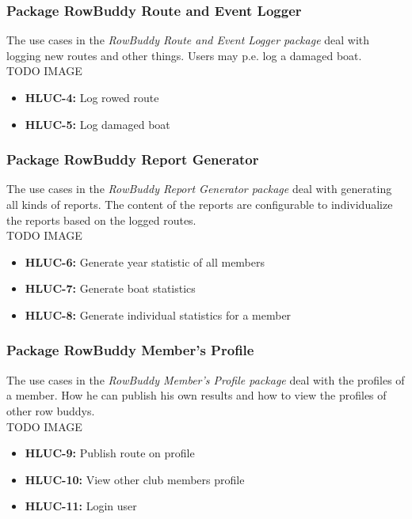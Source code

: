 		
		\subsubsection{Package RowBuddy Route and Event Logger}
		The use cases in the \textit{RowBuddy Route and Event Logger package} deal with logging new routes and other things. Users may p.e. log a damaged boat.\\
		
		TODO IMAGE
		\begin{itemize}
			\item \textbf{HLUC-4:} Log rowed route
			\item \textbf{HLUC-5:} Log damaged boat
		\end{itemize}
		
		\subsubsection{Package RowBuddy Report Generator}
		The use cases in the \textit{RowBuddy Report Generator package} deal with generating all kinds of reports. The content of the reports are configurable to individualize the reports based on the logged routes.\\
				
		TODO IMAGE
		\begin{itemize}
			\item \textbf{HLUC-6:} Generate year statistic of all members
			\item \textbf{HLUC-7:} Generate boat statistics
			\item \textbf{HLUC-8:} Generate individual statistics for a member
		\end{itemize}
		
		
		\subsubsection{Package RowBuddy Member's Profile}
		The use cases in the \textit{RowBuddy Member's Profile package} deal with the profiles of a member. How he can publish his own results and how to view the profiles of other row buddys.\\
		
		TODO IMAGE
		\begin{itemize}
			\item \textbf{HLUC-9:} Publish route on profile
			\item \textbf{HLUC-10:} View other club members profile
			\item \textbf{HLUC-11:} Login user
		\end{itemize}
		
		
		